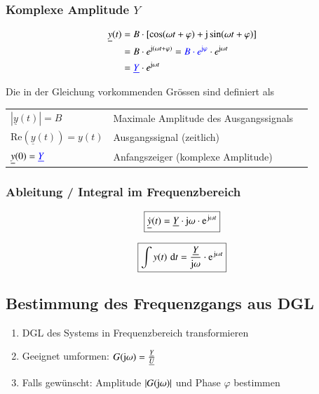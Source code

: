 \subsubsection{Komplexe Amplitude $Y$}

\vspace{-0.5cm} %
\begin{align*}
    \underline{y}(t) &= B \cdot [\cos(\omega t + \varphi) + \mathrm{j} \sin(\omega t + \varphi)] \\
                &= B \cdot e^{\mathrm{j}(\omega t + \varphi)} = {\color{blue}B \cdot e^{\mathrm{j} \varphi}} \cdot e^{\mathrm{j} \omega t} \\
                &= {\color{blue}\underline{Y}} \cdot e^{\mathrm{j} \omega t}
\end{align*}

Die in der Gleichung vorkommenden Grössen sind definiert als \\
\begin{tabular}{lll}
    $ | \underline{y}(t) | = B$                 & Maximale Amplitude des Ausgangssignals \\
    $ \mathrm{Re}(\underline{y}(t)) = y(t)$     & Ausgangssignal (zeitlich) \\
    $ \underline{y}(0) = {\color{blue}\underline{Y}} $  & Anfangszeiger (komplexe Amplitude)
\end{tabular}


\subsubsection{Ableitung / Integral im Frequenzbereich}

\begin{minipage}[c]{0.48\columnwidth}
    $$ \boxed{ \underline{\dot{y}}(t) = \underline{Y} \cdot \jimg \omega \cdot \e^{\jimg \omega t} } $$
\end{minipage}
\hfill
\begin{minipage}[c]{0.48\columnwidth}
    $$\boxed{ \int y(t) \, \diff t = \frac{\underline{Y}}{\jimg \omega} \cdot \e^{\jimg \omega t} } $$
\end{minipage}


\subsection{Bestimmung des Frequenzgangs aus DGL}

\begin{enumerate}
    \item DGL des Systems in Frequenzbereich transformieren
    \item Geeignet umformen: $G(\mathrm{j} \omega) = \frac{\underline{Y}}{\underline{U}}$
    \item Falls gewünscht: Amplitude $|G(\mathrm{j} \omega)|$ und Phase $\varphi$ bestimmen
\end{enumerate}


